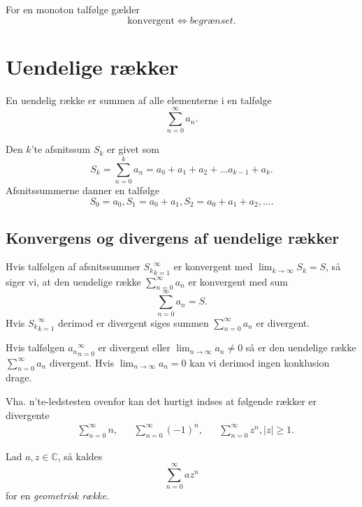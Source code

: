 \begin{sæt}
  For en monoton talfølge gælder
  \[ 
  \text{konvergent} \iff \textit{begrænset}
  .\]
\end{sæt}

\section{Uendelige rækker}
En uendelig række er summen af alle elementerne i en talfølge
\[ 
\sum_{n = 0}^{\infty} a_n
.\]

\begin{definition} 
  Den $k$'te afsnitssum $S_k$ er givet som
  \[ 
  S_k = \sum_{n = 0}^{k} a_n = a_0 + a_1 + a_2 + \ldots a_{k-1} + a_k
  .\]
  Afsnitssummerne danner en talfølge
  \[ 
  S_0 = a_0, S_1 = a_{0}+a_1, S_2 = a_0 + a_1 + a_2, \ldots 
  .\]
\end{definition}

\subsection{Konvergens og divergens af uendelige rækker}
\begin{sæt} 
  Hvis talfølgen af afsnitssummer ${S_k}_{k = 1}^{\infty}$ er konvergent med $\lim_{k \to \infty} S_k = S$, så siger vi, at den uendelige række $\sum_{n = 0}^{\infty} a_n $ er konvergent med sum
  \[ 
  \sum_{n = 0}^{\infty} a_n = S
  .\]
  Hvis ${S_k}_{k = 1}^{\infty}$ derimod er divergent siges summen $\sum_{n = 0}^{\infty} a_n$ er divergent.
\end{sæt}

\begin{sæt} 
  Hvis talfølgen ${a_n}_{n = 0}^{\infty}$ er divergent eller $\lim_{n \to \infty} a_n \neq 0$ så er den uendelige række $\sum_{n = 0}^{\infty} a_n$ divergent. Hvis $\lim_{n \to \infty} a_n = 0$ kan vi derimod ingen konklusion drage.
\end{sæt}
Vha. n'te-ledstesten ovenfor kan det hurtigt indses at følgende rækker er divergente
\begin{align*}
  &\sum_{n = 0}^{\infty} n,& &\sum_{n = 0}^{\infty} (-1)^{n},& &\sum_{n = 0}^{\infty} z^{n}, |z| \geq 1
.\end{align*}

\begin{definition}  \label{afs:georæk}
  Lad $a,z \in \mathbb{C}$, så kaldes
  \[ 
  \sum_{n = 0}^{\infty} a z^{n} 
  \]
  for en \textit{geometrisk række}.
\end{definition}

